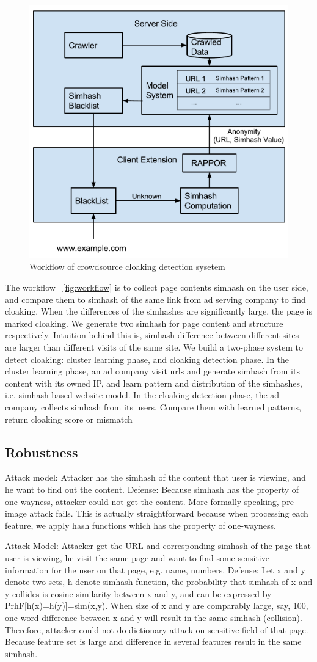 \begin{figure}[t]
  \centering
  \includegraphics[width=.45\textwidth]{fig/crowdsourcing-cloaking-detection-system}
  \caption{Workflow of crowdsource cloaking detection sysetem}
  \label{fig:workflow}
\end{figure}


The workflow ~\autoref{fig:workflow} is to collect page contents simhash on the user side, and compare
them to simhash of the same link from ad serving company to find cloaking. When
the differences of the simhashes are significantly large, the page is marked
cloaking. We generate two simhash for page content and structure respectively.
Intuition behind this is, simhash difference between different sites are larger
than different visits of the same site. We build a two-phase system to detect
cloaking: cluster learning phase, and cloaking detection phase. In the cluster
learning phase, an ad company visit urls and generate simhash from its content
with its owned IP, and learn pattern and distribution of the simhashes, i.e.
simhash-based website model. In the cloaking detection phase, the ad company
collects simhash from its users. Compare them with learned patterns, return
cloaking score or mismatch

\subsection{Robustness}
Attack model: Attacker has the simhash of the content that user is viewing, and
he want to find out the content.
Defense: Because simhash has the property of one-wayness, attacker could not get
the content. More formally speaking, pre-image attack fails. This is actually
straightforward because when processing each feature, we apply hash functions
which has the property of one-wayness.

Attack Model: Attacker get the URL and corresponding simhash of the page that
user is viewing, he visit the same page and want to find some sensitive
information for the user on that page, e.g. name, numbers.
Defense: Let x and y denote two sets, h denote simhash function, the probability
that simhash of x and y collides is cosine similarity between x and y, and can
be expressed by PrhF[h(x)=h(y)]=sim(x,y). When size of x and y are comparably
large, say, 100, one word difference between x and y will result in the same
simhash (collision). Therefore, attacker could not do dictionary attack on
sensitive field of that page. Because feature set is large and difference in
several features result in the same simhash.

